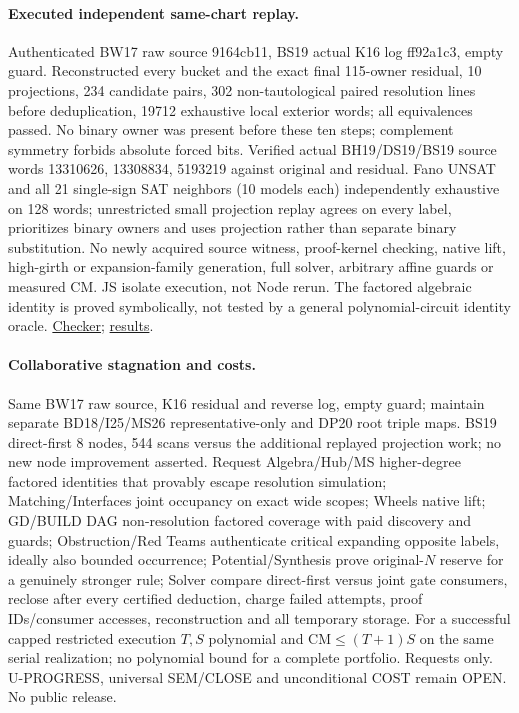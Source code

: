 \documentclass[11pt]{article}
\begin{document}
\paragraph{Executed independent same-chart replay.}
Authenticated BW17 raw source 9164cb11, BS19 actual K16 log ff92a1c3, empty guard. Reconstructed every bucket and the exact final 115-owner residual, 10 projections, 234 candidate pairs, 302 non-tautological paired resolution lines before deduplication, 19712 exhaustive local exterior words; all equivalences passed. No binary owner was present before these ten steps; complement symmetry forbids absolute forced bits. Verified actual BH19/DS19/BS19 source words 13310626, 13308834, 5193219 against original and residual. Fano UNSAT and all 21 single-sign SAT neighbors (10 models each) independently exhaustive on 128 words; unrestricted small projection replay agrees on every label, prioritizes binary owners and uses projection rather than separate binary substitution. No newly acquired source witness, proof-kernel checking, native lift, high-girth or expansion-family generation, full solver, arbitrary affine guards or measured CM. JS isolate execution, not Node rerun. The factored algebraic identity is proved symbolically, not tested by a general polynomial-circuit identity oracle. \href{https://github.com/j15marti/pnp/commit/1f6d1fdc714ddc92e229a6aa8e85d7c297dff3be}{Checker}; \href{https://github.com/j15marti/pnp/commit/4b107311a56ecf8eeb87afbd9fa221c318110f89}{results}.

\paragraph{Collaborative stagnation and costs.}
Same BW17 raw source, K16 residual and reverse log, empty guard; maintain separate BD18/I25/MS26 representative-only and DP20 root triple maps. BS19 direct-first 8 nodes, 544 scans versus the additional replayed projection work; no new node improvement asserted. Request Algebra/Hub/MS higher-degree factored identities that provably escape resolution simulation; Matching/Interfaces joint occupancy on exact wide scopes; Wheels native lift; GD/BUILD DAG non-resolution factored coverage with paid discovery and guards; Obstruction/Red Teams authenticate critical expanding opposite labels, ideally also bounded occurrence; Potential/Synthesis prove original-$N$ reserve for a genuinely stronger rule; Solver compare direct-first versus joint gate consumers, reclose after every certified deduction, charge failed attempts, proof IDs/consumer accesses, reconstruction and all temporary storage. For a successful capped restricted execution $T,S$ polynomial and $\mathrm{CM}\le(T+1)S$ on the same serial realization; no polynomial bound for a complete portfolio. Requests only. U-PROGRESS, universal SEM/CLOSE and unconditional COST remain OPEN. No public release.
\end{document}
